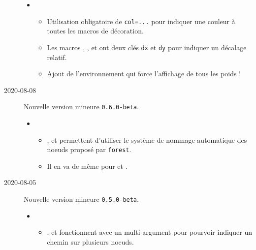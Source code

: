 \documentclass[12pt,a4paper]{article}
\begin{document}
\begin{description}
    \begin{itemize}[itemsep=.5em]
        \item {}
        \begin{itemize}[itemsep=.5em]
            \item Utilisation obligatoire de \verb#col=...# pour indiquer une couleur à toutes les macros de décoration.
            
            \item Les macros , , 
                   et 
                  ont deux clés \verb#dx# et \verb#dy# pour indiquer un décalage relatif.
            
            \item Ajout de l'environnement  qui force l'affichage de tous les poids !
        \end{itemize}
    \end{itemize}
    
    
    \separation

    \medskip
    \item[2020-08-08] Nouvelle version mineure \verb+0.6.0-beta+.
    
    \begin{itemize}[itemsep=.5em]
        \item {}
        \begin{itemize}[itemsep=.5em]
            \item {},  et  permettent d'utiliser le système de nommage automatique des noeuds proposé par \verb#forest#.
            
            \item Il en va de même pour  et .
        \end{itemize}
    \end{itemize}
    
    
    \separation

    \medskip
    \item[2020-08-05] Nouvelle version mineure \verb+0.5.0-beta+.
    
    \begin{itemize}[itemsep=.5em]
        \item {}
        \begin{itemize}[itemsep=.5em]
            \item {},  et  fonctionnent avec un multi-argument pour pourvoir indiquer un chemin sur plusieurs noeuds.
            

\end{itemize}
\end{itemize}
\end{description}
\end{document}

